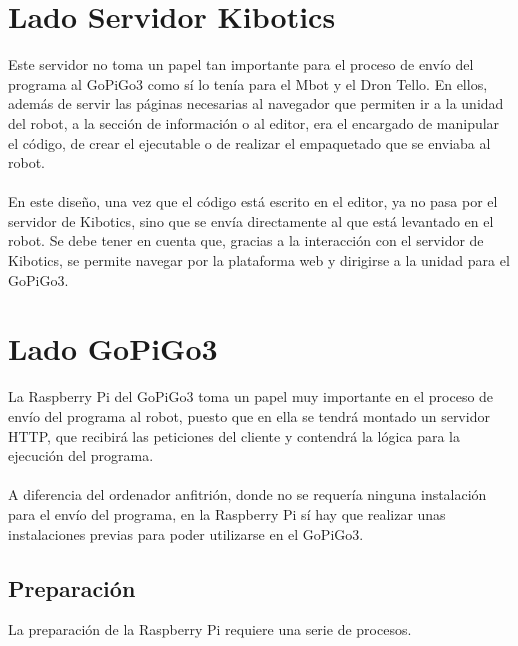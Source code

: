 \documentclass{report}
\begin{document}
\section{Lado Servidor Kibotics}

Este servidor no toma un papel tan importante para el proceso de envío del programa al GoPiGo3 como sí lo tenía para el Mbot y el Dron Tello. En ellos, además de servir las páginas necesarias al navegador que permiten ir a la unidad del robot, a la sección de información o al editor, era el encargado de manipular el código, de crear el ejecutable o de realizar el empaquetado que se enviaba al robot.
\\
\\
En este diseño, una vez que el código está escrito en el editor, ya no pasa por el servidor de Kibotics, sino que se envía directamente al que está levantado en el robot. Se debe tener en cuenta que, gracias a la interacción con el servidor de Kibotics, se permite navegar por la plataforma web y dirigirse a la unidad para el GoPiGo3.

\section{Lado GoPiGo3}

La Raspberry Pi del GoPiGo3 toma un papel muy importante en el proceso de envío del programa al robot, puesto que en ella se tendrá montado un servidor HTTP, que recibirá las peticiones del cliente y contendrá la lógica para la ejecución del programa.
\\
\\
A diferencia del ordenador anfitrión, donde no se requería ninguna instalación para el envío del programa, en la Raspberry Pi sí hay que realizar unas instalaciones previas para poder utilizarse en el GoPiGo3.

\subsection{Preparación}

La preparación de la Raspberry Pi requiere una serie de procesos.
\end{document}
